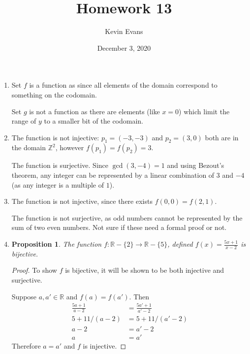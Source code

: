 \documentclass{homework}
\title{Homework 13}
\author{Kevin Evans}
\date{December 3, 2020}
\newtheorem*{prop}{Proposition}
\begin{document}
	\maketitle
	\begin{enumerate}
		\item Set $f$ is a function as since all elements of the domain correspond to something on the codomain.
		
			Set $g$ is not a function as there are elements (like $x=0$) which limit the range of $y$ to a smaller bit of the codomain.
			
		\item The function is not injective: $p_1 = (-3, -3)$ and $p_2 = (3, 0)$ both are in the domain $\mathbb{Z}^2$, however $f(p_1) = f(p_2) = 3$.
		
		The function is surjective. Since $\gcd(3, -4) = 1$ and using Bezout's theorem, any integer can be represented by a linear combination of $3$ and $-4$ (as any integer is a multiple of $1$).
		
		
		\item The function is not injective, since there exists $f(0, 0) = f(2, 1)$.
		
			The function is not surjective, as odd numbers cannot be represented by the sum of two even numbers. Not sure if these need a formal proof or not. 
			
		\item  \begin{minipage}[t]{\linewidth}
			\begin{prop}
				The function $f:\mathbb{R} - \{2\} \to \mathbb{R} - \{5\}$, defined $f(x) = \frac{5x+1}{x-2}$ is bijective.
			\end{prop}
			\begin{proof} To show $f$ is bijective, it will be shown to be both injective and surjective.
				
				Suppose $a, a' \in \mathbb{R}$ and $f(a) = f(a')$. Then \begin{align*}
					\frac{5a+1}{a-2} & = \frac{5a' + 1}{a'-2} \\
					5 + 11 / (a-2) & = 5 + 11 / (a' - 2) \\
					a - 2 & = a' - 2 \\
					a & = a'
				\end{align*}
				Therefore $a=a'$ and $f$ is injective.
				

\end{proof}
\end{minipage}
\end{enumerate}
\end{document}
